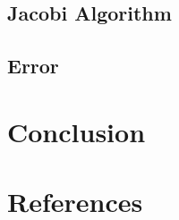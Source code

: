 \documentclass{article}
\begin{document}
\subsection{Jacobi Algorithm}

\subsection{Error}

\section{Conclusion}

\section{References}

\end{document}
